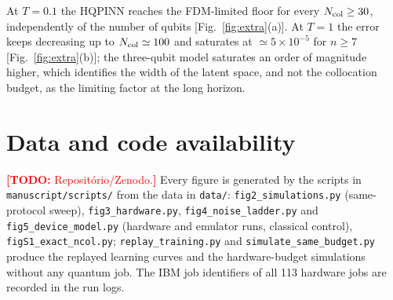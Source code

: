 \documentclass[floatfix,aps,pra,twocolumn,superscriptaddress,10pt,nofootinbib]{revtex4-2}
\newif\ifshowtodos \showtodostrue
\newcommand{\TODO}[1]{\ifshowtodos\textcolor{red}{\textbf{[TODO:} #1\textbf{]}}\fi}
\newcommand{\Ncol}{N_{\rm col}}
\begin{document}
\begin{appendices}
At $T=0.1$ the HQPINN reaches the FDM-limited floor for every $\Ncol\ge30$, independently of the number of qubits [Fig.~\ref{fig:extra}(a)]. At $T=1$ the error keeps decreasing up to $\Ncol\simeq100$ and saturates at $\simeq5\times10^{-5}$ for $n\ge7$ [Fig.~\ref{fig:extra}(b)]; the three-qubit model saturates an order of magnitude higher, which identifies the width of the latent space, and not the collocation budget, as the limiting factor at the long horizon.

\section{Data and code availability}\label{app:data}
\TODO{Reposit\'orio/Zenodo.} Every figure is generated by the scripts in \texttt{manuscript/scripts/} from the data in \texttt{data/}: \texttt{fig2\_simulations.py} (same-protocol sweep), \texttt{fig3\_hardware.py}, \texttt{fig4\_noise\_ladder.py} and \texttt{fig5\_device\_model.py} (hardware and emulator runs, classical control), \texttt{figS1\_exact\_ncol.py}; \texttt{replay\_training.py} and \texttt{simulate\_same\_budget.py} produce the replayed learning curves and the hardware-budget simulations without any quantum job. The IBM job identifiers of all 113 hardware jobs are recorded in the run logs.

\end{appendices}


\end{document}

